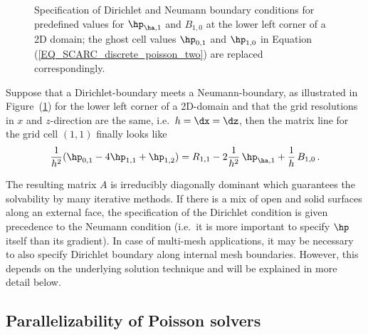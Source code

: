 \begin{figure}[ht]
\caption{Specification of Dirichlet and Neumann boundary conditions for predefined values for $\hp_{\ha,1}$ and $B_{1,0}$ at the lower left corner of a 2D domain; the ghost cell values $\hp_{0,1}$ and $\hp_{1,0}$ in Equation (\ref{EQ_SCARC_discrete_poisson_two}) are replaced correspondingly.}
\label{FIG_SCARC_bc_setting}
\end{figure}

Suppose that a Dirichlet-boundary meets a Neumann-boundary, as illustrated in Figure~(\ref{FIG_SCARC_bc_setting}) for the lower left corner of a 2D-domain and 
that the grid resolutions in $x$ and $z$-direction are the same, i.e.\ $h=\dx=\dz$, then the matrix line for the grid cell $(1,1)$ finally looks like
\begin{equation*}
\frac{1}{h^2} (\hp_{0,1} - 4\hp_{1,1} + \hp_{1,2} ) = R_{1,1} - 2\frac{1}{h^2} \, \hp_{\ha,1} + \frac{1}{h} \, B_{1,0} \,.
\end{equation*}

The resulting matrix $A$ is irreducibly diagonally dominant which guarantees the solvability by many iterative 
methods.
%
If there is a mix of open and solid surfaces along an external face, the specification of the Dirichlet condition is given precedence to the Neumann condition (i.e.\ it is more important to specify $\hp$ itself than its gradient).
%
In case of multi-mesh applications, it may be necessary to also specify Dirichlet boundary along internal mesh boundaries. However, this depends on the underlying solution technique and will be explained in more detail below.

\subsection{Parallelizability of Poisson solvers}
\label{SEC_SCARC_solver}


